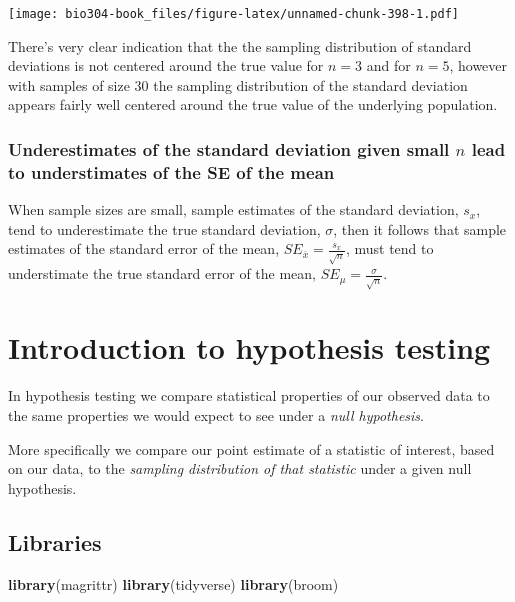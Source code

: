 \documentclass[]{book}
\newenvironment{Shaded}{\begin{snugshade}}{\end{snugshade}}
\newcommand{\KeywordTok}[1]{\textcolor[rgb]{0.13,0.29,0.53}{\textbf{#1}}}
\newcommand{\NormalTok}[1]{#1}
\theoremstyle{definition}
\theoremstyle{definition}
\theoremstyle{definition}
\theoremstyle{remark}
\begin{document}
\texttt{[image: bio304-book\_files/figure-latex/unnamed-chunk-398-1.pdf]}

There's very clear indication that the the sampling distribution of
standard deviations is not centered around the true value for \(n=3\)
and for \(n=5\), however with samples of size 30 the sampling
distribution of the standard deviation appears fairly well centered
around the true value of the underlying population.

\hypertarget{underestimates-of-the-standard-deviation-given-small-n-lead-to-understimates-of-the-se-of-the-mean}{%
\subsection{\texorpdfstring{Underestimates of the standard deviation
given small \(n\) lead to understimates of the SE of the
mean}{Underestimates of the standard deviation given small n lead to understimates of the SE of the mean}}\label{underestimates-of-the-standard-deviation-given-small-n-lead-to-understimates-of-the-se-of-the-mean}}

When sample sizes are small, sample estimates of the standard deviation,
\(s_x\), tend to underestimate the true standard deviation, \(\sigma\),
then it follows that sample estimates of the standard error of the mean,
\(SE_{\overline{x}} = \frac{s_x}{\sqrt{n}}\), must tend to understimate
the true standard error of the mean,
\(SE_\mu = \frac{\sigma}{\sqrt{n}}\).

\hypertarget{introduction-to-hypothesis-testing}{%
\chapter{Introduction to hypothesis
testing}\label{introduction-to-hypothesis-testing}}

In hypothesis testing we compare statistical properties of our observed
data to the same properties we would expect to see under a \emph{null
hypothesis}.

More specifically we compare our point estimate of a statistic of
interest, based on our data, to the \emph{sampling distribution of that
statistic} under a given null hypothesis.

\hypertarget{libraries-6}{%
\section{Libraries}\label{libraries-6}}

\begin{Shaded}
\begin{Highlighting}[]
\KeywordTok{library}\NormalTok{(magrittr)}
\KeywordTok{library}\NormalTok{(tidyverse)}
\KeywordTok{library}\NormalTok{(broom)}
\end{Highlighting}
\end{Shaded}
\end{document}
